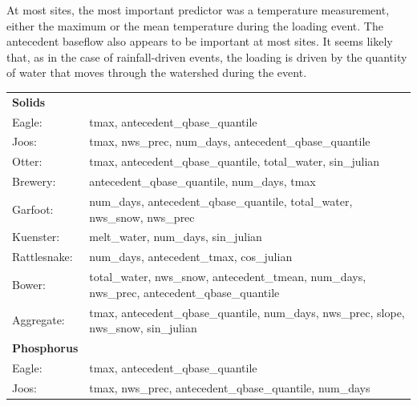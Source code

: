 \documentclass[10pt]{article}
\begin{document}
At most sites, the most important predictor was a temperature measurement, either the maximum or the mean temperature during the loading event. The antecedent baseflow also appears to be important at most sites. It seems likely that, as in the case of rainfall-driven events, the loading is driven by the quantity of water that moves through the watershed during the event.\\

\begin{table}[h!]\small
    \begin{center}
    \begin{tabular}{ll}
        \textbf{Solids} & \\
        \hspace{5mm} Eagle: & tmax, antecedent\_qbase\_quantile\\
        \hspace{5mm} Joos: & tmax, nws\_prec, num\_days, antecedent\_qbase\_quantile\\
        \hspace{5mm} Otter: & tmax, antecedent\_qbase\_quantile, total\_water, sin\_julian\\
        \hspace{5mm} Brewery: & antecedent\_qbase\_quantile, num\_days, tmax\\
        \hspace{5mm} Garfoot: & num\_days, antecedent\_qbase\_quantile, total\_water, nws\_snow, nws\_prec\\
        \hspace{5mm} Kuenster: & melt\_water, num\_days, sin\_julian\\
        \hspace{5mm} Rattlesnake: & num\_days, antecedent\_tmax, cos\_julian \\
        \hspace{5mm} Bower: & total\_water, nws\_snow, antecedent\_tmean, num\_days, nws\_prec, antecedent\_qbase\_quantile\\
        \hspace{5mm} Aggregate: & tmax, antecedent\_qbase\_quantile, num\_days, nws\_prec, slope, nws\_snow, sin\_julian
    \vspace{2mm}\\
        \textbf{Phosphorus} & \\
        \hspace{5mm} Eagle: & tmax, antecedent\_qbase\_quantile\\
        \hspace{5mm} Joos: & tmax, nws\_prec, antecedent\_qbase\_quantile, num\_days\\

\end{tabular}
\end{center}
\end{table}
\end{document}
